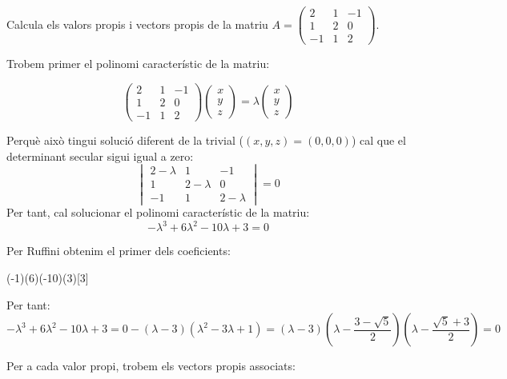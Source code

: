 \Exercise[title=Vectors i valors propis en una matriu $3\times 3$\medskip] 
\vspace{\baselineskip}
Calcula els valors propis i vectors propis de la matriu $A=\begin{pmatrix}2&1&-1\\1&2&0\\-1&1&2\end{pmatrix}$. 
\Answer

Trobem primer el polinomi característic de la matriu:

\[
  \begin{pmatrix}2&1&-1\\1&2&0\\-1&1&2\end{pmatrix}
  \begin{pmatrix}x\\y\\z\end{pmatrix}=\lambda\begin{pmatrix}x\\y\\z\end{pmatrix}\]

  Perquè això tingui solució diferent de la trivial ($(x,y,z)=(0,0,0)$) cal que el determinant secular sigui igual a zero:
  \[
  \begin{vmatrix}2-\lambda&1&-1\\1&2-\lambda&0\\-1&1&2-\lambda\end{vmatrix}=0  
  \]
  Per tant, cal solucionar el polinomi característic de la matriu:
  \[-\lambda^3+6\lambda^2-10\lambda+3=0\]

  Per Ruffini obtenim el primer dels coeficients:
  
  \begin{center}
  \Ruffini(-1)(6)(-10)(3)[3]
  \end{center}
  Per tant:
  \[-\lambda^3+6\lambda^2-10\lambda+3=0
  -(\lambda-3)(\lambda^2-3\lambda+1)=(\lambda-3)(\lambda-\frac{3-\sqrt{5}}{2})(\lambda-\frac{\sqrt{5}+3}{2})=0\]


Per a cada valor propi, trobem els vectors propis associats:

